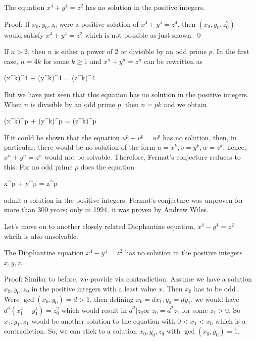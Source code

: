 \begin{theorem}
    The equation $x^4 + y^4 = z^2$ has no solution in the positive integers.
\end{theorem}

Proof: If $x_0, y_0, z_0$ were a positive solution of $x^4 + y^4 = z^4$, then $(x_0, y_0, z_0^2)$ would satisfy $x^4 + y^4 =z^2$ which is not possible as just shown. \qed

If $n > 2$, then $n$ is either a power of $2$ or divisible by an odd prime $p$. In the first case, $n =4k$ for some $k \geq 1$ and $x^n + y^n = z^n$ can be rewritten as

\bee
(x^k)^4 + (y^k)^4 = (z^k)^4
\eee

But we have just seen that this equation has no solution in the positive integers. When $n$ is divisible by an odd prime $p$, then $n = pk$ and we obtain

\bee
(x^k)^p + (y^k)^p = (z^k)^p
\eee

If it could be shown that the equation $u^p + v^p = w^p$ has no solution, then, in particular, there would be no solution of the form $u = x^k, v = y^k, w = z^k$; hence, $x^n + y^n = z^n$ would not be solvable. Therefore, Fermat’s conjecture reduces to this: For no odd prime $p$ does the equation 

\bee
x^p + y^p = z^p
\eee

admit a solution in the positive integers. Fermat's conjecture was unproven for more than 300 years; only in 1994, it was proven by Andrew Wiles.


Let's move on to another closely related Diophantine equation, $x^4 - y^4 = z^2$ whcih is also unsolvable.

\begin{theorem}\label{2023-03-28:th4}
The Diophantine equation $x^4 - y^4 = z^2$ has no solution in the positive integers $x, y, z$.
\end{theorem}

Proof: Similar to before, we provide via contradiction. Assume we have a solution $x_0, y_0, z_0$ in the positive integers with a least value $x$. Then $x_0$ has to be odd . Were $\gcd(x_0, y_0) = d > 1$, then defining $x_0 = d x_1, y_0 = d y_1$, we would have $d^4(x_1^4 - y_1^4) = z_0^2$ which would result in $d^2 | z_0$or $z_0 = d^2 z_1$ for some $z_1 > 0$. So $x_1, y_1, z_1$ would be another solution to the equation with $0 < x_1 < x_0$ which is a contradiction. So, we can stick to a solution $x_0, y_0, z_0$ with $\gcd(x_0, y_0) = 1$.

